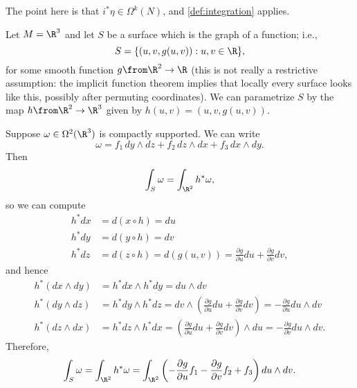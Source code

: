The point here is that $i^\ast \eta \in \Omega^k(N)$, and \cref{def:integration} applies.

\begin{example}\label{ex:surface integral}
	Let $M = \R^3$ and let $S$ be a surface which is the graph of a function; i.e.,
	\[
		S = \{(u,v,g(u,v)) : u,v \in \R\},
	\]
	for some smooth function $g \from \R^2 \to \R$ (this is not really a restrictive assumption: the implicit function theorem implies that locally every surface looks like this, possibly after permuting coordinates). We can parametrize $S$ by the map $h \from \R^2 \to \R^3$ given by $h(u,v) = (u,v,g(u,v))$.
	
	Suppose $\omega \in \Omega^2(\R^3)$ is compactly supported. We can write
	\[
		\omega = f_1 \, dy\wedge dz + f_2 \, dz \wedge dx + f_3 \, dx \wedge dy.
	\]
	Then
	\[
		\int_S \omega = \int_{\R^2} h^\ast \omega,
	\]
	so we can compute
	\begin{align*}
		h^\ast dx & = d(x \circ h) = du \\
		h^\ast dy & = d(y \circ h) = dv \\
		h^\ast dz & = d(z \circ h) = d(g(u,v)) = \frac{\partial g}{\partial u} du + \frac{\partial g}{\partial v} dv,
	\end{align*}
	and hence
	\begin{align*}
		h^\ast (dx \wedge dy) & = h^\ast dx \wedge h^\ast dy = du \wedge dv \\
		h^\ast (dy \wedge dz) & = h^\ast dy \wedge h^\ast dz = dv \wedge \left(\frac{\partial g}{\partial u} du + \frac{\partial g}{\partial v} dv \right) = -\frac{\partial g}{\partial u} du  \wedge dv \\
		h^\ast (dz \wedge dx) & = h^\ast dz \wedge h^\ast dx = \left( \frac{\partial g}{\partial u} du + \frac{\partial g}{\partial v} dv\right) \wedge du = -\frac{\partial g}{\partial v} du \wedge dv.
	\end{align*}
	Therefore,
	\begin{equation}\label{eq:surface integral formula} 
		\int_S \omega = \int_{\R^2} h^\ast \omega = \int_{\R^2} \left( -\frac{\partial g}{\partial u}f_1 -\frac{\partial g}{\partial v}f_2 + f_3\right) du \wedge dv.
	\end{equation}
	

\end{example}
